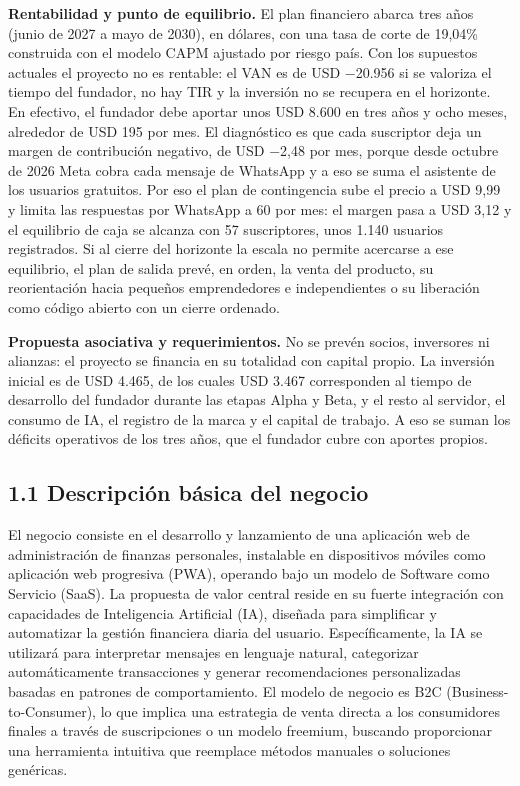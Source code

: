 \textbf{Rentabilidad y punto de equilibrio.} El plan financiero abarca
tres años (junio de 2027 a mayo de 2030), en dólares, con una tasa de
corte de 19,04\% construida con el modelo CAPM ajustado por riesgo país.
Con los supuestos actuales el proyecto no es rentable: el VAN es de USD
−20.956 si se valoriza el tiempo del fundador, no hay TIR y la inversión
no se recupera en el horizonte. En efectivo, el fundador debe aportar
unos USD 8.600 en tres años y ocho meses, alrededor de USD 195 por mes.
El diagnóstico es que cada suscriptor deja un margen de contribución
negativo, de USD −2,48 por mes, porque desde octubre de 2026 Meta cobra
cada mensaje de WhatsApp y a eso se suma el asistente de los usuarios
gratuitos. Por eso el plan de contingencia sube el precio a USD 9,99 y
limita las respuestas por WhatsApp a 60 por mes: el margen pasa a USD
3,12 y el equilibrio de caja se alcanza con 57 suscriptores, unos 1.140
usuarios registrados. Si al cierre del horizonte la escala no permite
acercarse a ese equilibrio, el plan de salida prevé, en orden, la venta
del producto, su reorientación hacia pequeños emprendedores e
independientes o su liberación como código abierto con un cierre
ordenado.

\textbf{Propuesta asociativa y requerimientos.} No se prevén socios,
inversores ni alianzas: el proyecto se financia en su totalidad con
capital propio. La inversión inicial es de USD 4.465, de los cuales USD
3.467 corresponden al tiempo de desarrollo del fundador durante las
etapas Alpha y Beta, y el resto al servidor, el consumo de IA, el
registro de la marca y el capital de trabajo. A eso se suman los
déficits operativos de los tres años, que el fundador cubre con aportes
propios.


\subsection*{1.1 Descripción básica del
negocio}\label{descripciuxf3n-buxe1sica-del-negocio}

El negocio consiste en el desarrollo y lanzamiento de una aplicación web
de administración de finanzas personales, instalable en dispositivos
móviles como aplicación web progresiva (PWA), operando bajo un modelo de
Software como Servicio (SaaS). La propuesta de valor central reside en
su fuerte integración con capacidades de Inteligencia Artificial (IA),
diseñada para simplificar y automatizar la gestión financiera diaria del
usuario. Específicamente, la IA se utilizará para interpretar mensajes
en lenguaje natural, categorizar automáticamente transacciones y generar
recomendaciones personalizadas basadas en patrones de comportamiento. El
modelo de negocio es B2C (Business-to-Consumer), lo que implica una
estrategia de venta directa a los consumidores finales a través de
suscripciones o un modelo freemium, buscando proporcionar una
herramienta intuitiva que reemplace métodos manuales o soluciones
genéricas.

